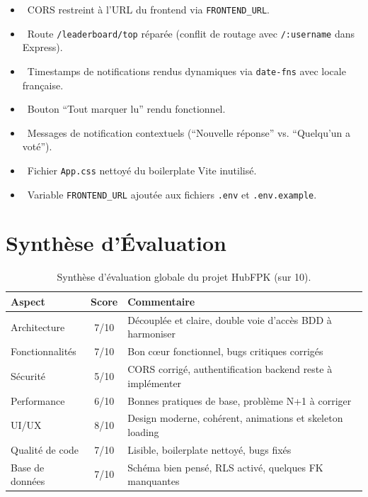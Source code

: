 \documentclass[12pt, a4paper]{report}
\begin{document}
\begin{itemize}
    \item \checkmark\ CORS restreint à l'URL du frontend via \texttt{FRONTEND\_URL}.
    \item \checkmark\ Route \texttt{/leaderboard/top} réparée (conflit de routage avec \texttt{/:username} dans Express).
    \item \checkmark\ Timestamps de notifications rendus dynamiques via \texttt{date-fns} avec locale française.
    \item \checkmark\ Bouton ``Tout marquer lu'' rendu fonctionnel.
    \item \checkmark\ Messages de notification contextuels (``Nouvelle réponse'' vs. ``Quelqu'un a voté'').
    \item \checkmark\ Fichier \texttt{App.css} nettoyé du boilerplate Vite inutilisé.
    \item \checkmark\ Variable \texttt{FRONTEND\_URL} ajoutée aux fichiers \texttt{.env} et \texttt{.env.example}.
\end{itemize}

\section{Synthèse d'Évaluation}

\begin{table}[H]
\centering
\renewcommand{\arraystretch}{1.4}
\begin{tabularx}{\textwidth}{l c X}
\toprule
\textbf{Aspect} & \textbf{Score} & \textbf{Commentaire} \\
\midrule
Architecture & 7/10 & Découplée et claire, double voie d'accès BDD à harmoniser \\
Fonctionnalités & 7/10 & Bon c\oe{}ur fonctionnel, bugs critiques corrigés \\
Sécurité & 5/10 & CORS corrigé, authentification backend reste à implémenter \\
Performance & 6/10 & Bonnes pratiques de base, problème N+1 à corriger \\
UI/UX & 8/10 & Design moderne, cohérent, animations et skeleton loading \\
Qualité de code & 7/10 & Lisible, boilerplate nettoyé, bugs fixés \\
Base de données & 7/10 & Schéma bien pensé, RLS activé, quelques FK manquantes \\
\bottomrule
\end{tabularx}
\caption{Synthèse d'évaluation globale du projet HubFPK (sur 10).}
\end{table}
\end{document}
